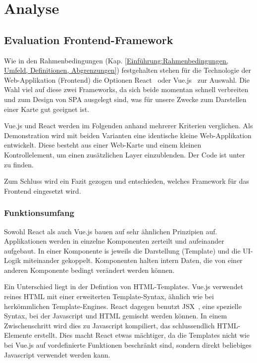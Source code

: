 
\section{Analyse}
\label{Analyse}


\subsection{Evaluation Frontend-Framework}
\label{Analyse:Evaluation Frontend-Framework}

Wie in den Rahmenbedingungen (Kap. \ref{Einführung:Rahmenbedingungen, Umfeld, Definitionen, Abgrenzungen}) festgehalten stehen für die Technologie der Web-Applikation (Frontend) die Optionen React~\cite{react} oder Vue.js~\cite{vuejs} zur Auswahl.
Die Wahl viel auf diese zwei Frameworks, da sich beide momentan schnell verbreiten und zum Design von \ac{SPA} ausgelegt sind, was für unsere Zwecke zum Darstellen einer Karte gut geeignet ist.

Vue.js und React werden im Folgenden anhand mehrerer Kriterien verglichen.
Als Demonstration wird mit beiden Varianten eine identische kleine Web-Applikation entwickelt.
Diese besteht aus einer Web-Karte und einem kleinen Kontrollelement, um einen zusätzlichen Layer einzublenden.
Der Code ist unter~\cite{github:playground} zu finden.

Zum Schluss wird ein Fazit gezogen und entschieden, welches Framework für das Frontend eingesetzt wird.

\subsubsection{Funktionsumfang}
\label{Analyse Framework:Funktionsumfang}

Sowohl React als auch Vue.js bauen auf sehr ähnlichen Prinzipien auf.
Applikationen werden in einzelne Komponenten zerteilt und aufeinander aufgebaut.
In einer Komponente is jeweils die Darstellung (Template) und die UI-Logik miteinander gekoppelt.
Komponenten halten intern Daten, die von einer anderen Komponente bedingt verändert werden können.

Ein Unterschied liegt in der Defintion von HTML-Templates.
Vue.js verwendet reines HTML mit einer erweiterten Template-Syntax, ähnlich wie bei herkömmlichen Template-Engines.
React dagegen benutzt JSX~\cite{jsx}, eine spezielle Syntax, bei der Javascript und HTML gemischt werden können.
In einem Zwischenschritt wird dies zu Javascript kompiliert, das schlussendlich HTML-Elemente erstellt.
Dies macht React etwas mächtiger, da die Templates nicht wie bei Vue.js auf vordefinierte Funktionen beschränkt sind, sondern direkt beliebiges Javascript verwendet werden kann.

